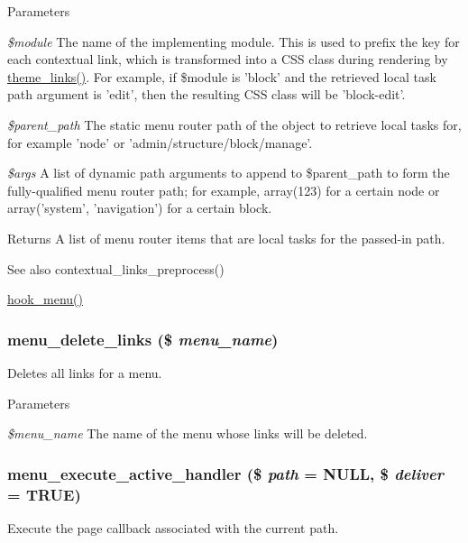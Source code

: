 \begin{DoxyParams}{Parameters}
\item[{\em \$module}]The name of the implementing module. This is used to prefix the key for each contextual link, which is transformed into a CSS class during rendering by \hyperlink{group__themeable_gab75b290dbc9541e2fb0d9e57cbcdda5c}{theme\_\-links()}. For example, if \$module is 'block' and the retrieved local task path argument is 'edit', then the resulting CSS class will be 'block-\/edit'. \item[{\em \$parent\_\-path}]The static menu router path of the object to retrieve local tasks for, for example 'node' or 'admin/structure/block/manage'. \item[{\em \$args}]A list of dynamic path arguments to append to \$parent\_\-path to form the fully-\/qualified menu router path; for example, array(123) for a certain node or array('system', 'navigation') for a certain block.\end{DoxyParams}
\begin{DoxyReturn}{Returns}
A list of menu router items that are local tasks for the passed-\/in path.
\end{DoxyReturn}
\begin{DoxySeeAlso}{See also}
contextual\_\-links\_\-preprocess() 

\hyperlink{group__hooks_ga5c95244fea59b25666e409759e133ded}{hook\_\-menu()} 
\end{DoxySeeAlso}
\hypertarget{group__menu_gade553e3a51918b9290425df7f775aa14}{
\subsubsection[{menu\_\-delete\_\-links}]{\setlength{\rightskip}{0pt plus 5cm}menu\_\-delete\_\-links (\$ {\em menu\_\-name})}}
\label{group__menu_gade553e3a51918b9290425df7f775aa14}
Deletes all links for a menu.


\begin{DoxyParams}{Parameters}
\item[{\em \$menu\_\-name}]The name of the menu whose links will be deleted. \end{DoxyParams}
\hypertarget{group__menu_gae33bae24fcac6126aa272d1c437f947c}{
\subsubsection[{menu\_\-execute\_\-active\_\-handler}]{\setlength{\rightskip}{0pt plus 5cm}menu\_\-execute\_\-active\_\-handler (\$ {\em path} = {\ttfamily NULL}, \/  \$ {\em deliver} = {\ttfamily TRUE})}}
\label{group__menu_gae33bae24fcac6126aa272d1c437f947c}
Execute the page callback associated with the current path.


